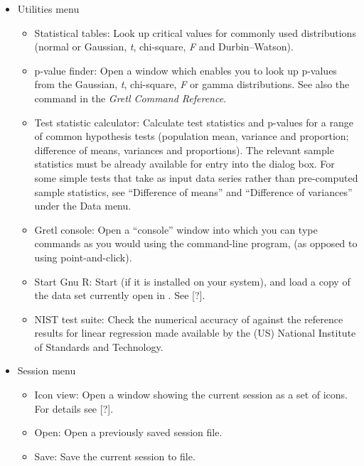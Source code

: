 \begin{itemize}
\item \textsf{Utilities menu}
  \begin{itemize}
  \item \textsf{Statistical tables}: Look up critical values for
    commonly used distributions (normal or Gaussian, \emph{t},
    chi-square, \emph{F} and Durbin--Watson).
  \item \textsf{p-value finder}: Open a window which enables you to
    look up p-values from the Gaussian, \emph{t}, chi-square, \emph{F}
    or gamma distributions. See also the  command in the
    \emph{Gretl Command Reference}.
	    
  \item \textsf{Test statistic calculator}: Calculate test statistics
    and p-values for a range of common hypothesis tests (population
    mean, variance and proportion; difference of means, variances and
    proportions).  The relevant sample statistics must be already
    available for entry into the dialog box. For some simple tests
    that take as input data series rather than pre-computed sample
    statistics, see ``Difference of means'' and ``Difference of
    variances'' under the Data menu.
  \item \textsf{Gretl console}: Open a ``console'' window into which
    you can type commands as you would using the command-line program,
     (as opposed to using point-and-click).
	    
  \item \textsf{Start Gnu R}: Start  (if it is installed on
    your system), and load a copy of the data set currently open in
    .  See [?].
	    
  \item \textsf{NIST test suite}: Check the numerical accuracy of
     against the reference results for linear regression
    made available by the (US) National Institute of Standards and
    Technology.
  \end{itemize}


\item \textsf{Session menu}
  \begin{itemize}
  \item \textsf{Icon view}: Open a window showing the current
     session as a set of icons.  For details see [?].
	    
  \item \textsf{Open}: Open a previously saved session file.
	    
  \item \textsf{Save}: Save the current session to file.
	    

\end{itemize}
\end{itemize}
